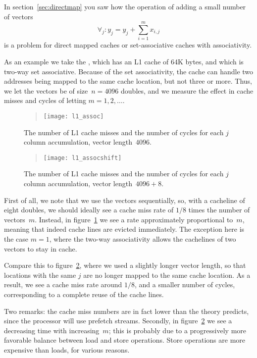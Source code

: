 In section~\ref{sec:directmap} you saw how
the operation of adding a small number of vectors
\[ \forall_j\colon y_j= y_j+\sum_{i=1}^mx_{i,j} \]
is a problem for direct mapped caches or set-associative caches with
associativity.

As an example we take the
, which has an L1 cache of 64K bytes, and
which is two-way set associative. Because of the set associativity,
the cache can handle two addresses being mapped to the same cache
location, but not three or more. Thus, we let the vectors be of
size~$n=4096$ doubles, and we measure the effect in cache misses and
cycles of letting $m=1,2,\ldots$.

\begin{figure}[ht]
  \begin{quote}
  \texttt{[image: l1\_assoc]}
  \end{quote}
  \caption{The number of L1 cache misses and the number of cycles for
    each $j$ column accumulation, vector length~$4096$.}
  \label{fig:l1_assoc}
\end{figure}

\begin{figure}[ht]
  \begin{quote}
  \texttt{[image: l1\_assocshift]}
  \end{quote}
  \caption{The number of L1 cache misses and the number of cycles for
    each $j$ column accumulation, vector length~$4096+8$.}
  \label{fig:l1_assoc_shift}
\end{figure}

First of all, we note that we use the vectors sequentially, so, with a
cacheline of eight doubles, we should ideally see a cache miss rate of
$1/8$ times the number of vectors~$m$. Instead, in
figure~\ref{fig:l1_assoc} we see a rate approximately proportional
to~$m$, meaning that indeed cache lines are evicted immediately. The
exception here is the case $m=1$, where the two-way associativity
allows the cachelines of two vectors to stay in cache.

Compare this to figure~\ref{fig:l1_assoc_shift}, where we used a
slightly longer vector length, so that locations with the same $j$ are
no longer mapped to the same cache location. As a result, we see a
cache miss rate around $1/8$, and a smaller number of cycles,
corresponding to a complete reuse of the cache lines. 

Two remarks: the cache miss numbers are in fact lower than the theory
predicts, since the processor will use prefetch streams. Secondly, in
figure~\ref{fig:l1_assoc_shift} we see a decreasing time with
increasing~$m$; this is probably due to a progressively more
favorable balance between load and store operations. Store operations
are more expensive than loads, for various reasons.


